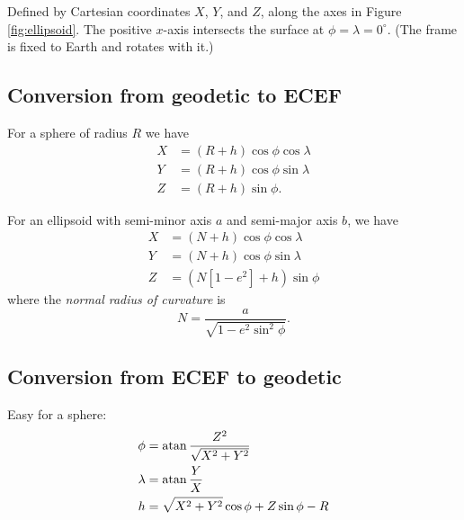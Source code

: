 Defined by Cartesian coordinates $X$, $Y$, and $Z$, along the axes in Figure \ref{fig:ellipsoid}. The positive $x$-axis intersects the surface at $\phi = \lambda = 0^\circ$. (The frame is fixed to Earth and rotates with it.)

\subsection{Conversion from geodetic to ECEF}

For a sphere of radius $R$ we have
\begin{equation}
\begin{split}
    X &= (R+h) \cos \phi \cos \lambda \\
    Y &= (R+h) \cos \phi \sin \lambda \\
    Z &= (R+h) \sin \phi .
\end{split}
\end{equation}

For an ellipsoid with semi-minor axis $a$ and semi-major axis $b$, we have
\begin{equation}
\begin{split}
    X &= (N + h) \cos \phi \cos \lambda \\
    Y &= (N + h) \cos \phi \sin \lambda \\
    Z &= \left( N[1-e^2] + h \right) \sin \phi
\end{split}
\end{equation}
where the \emph{normal radius of curvature} is
\begin{equation}
    N = \frac{a}{\sqrt{1-e^2 \sin^2 \phi}} .
\end{equation}

\subsection{Conversion from ECEF to geodetic}

Easy for a sphere:
\begin{equation}
\begin{split}
    \phi    &= \operatorname{atan} \frac{Z^2}{\sqrt{X^2 + Y^2}} \\
    \lambda &= \operatorname{atan} \frac{Y}{X}                  \\
    h       &= \sqrt{X^2 + Y^2} \cos \phi + Z \sin \phi - R
\end{split}
\end{equation}

